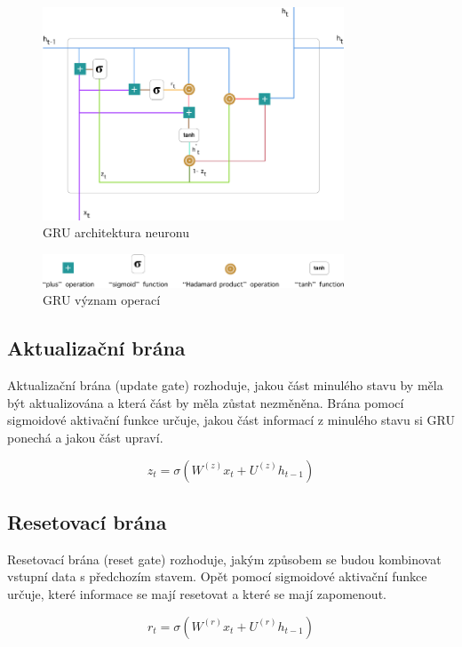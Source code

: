 \begin{figure}[H]
	\centering
	\includegraphics[width=0.8\textwidth]{Figures/GRU_architecture_neuron.png}
	\caption{GRU architektura neuronu~\cite{link4}}\label{fig:GRU architektura neuronu}
\end{figure}

\begin{figure}[H]
	\centering
	\includegraphics[width=0.8\textwidth]{Figures/GRU_math_operation.png}
	\caption{GRU význam operací~\cite{link4}}\label{fig:GRU vyznam operaci}
\end{figure}

\subsection{Aktualizační brána}
Aktualizační brána (update gate) rozhoduje, jakou část minulého stavu by měla být aktualizována a která část by měla zůstat nezměněna.
Brána pomocí sigmoidové aktivační funkce určuje, jakou část informací z minulého stavu si GRU ponechá a jakou část upraví.

\[z_{t} = \sigma(W^{(z)} x_{t} + U^{(z)} h_{t-1})\]

\subsection{Resetovací brána}
Resetovací brána (reset gate) rozhoduje, jakým způsobem se budou kombinovat vstupní data s předchozím stavem.
Opět pomocí sigmoidové aktivační funkce určuje, které informace se mají resetovat a které se mají zapomenout.

\[r_{t} = \sigma(W^{(r)} x_{t} + U^{(r)} h_{t-1})\]

